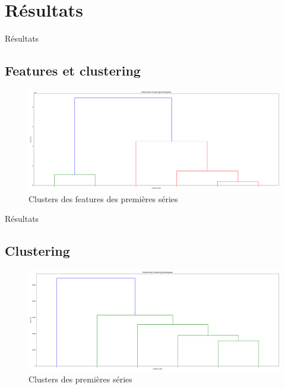 \documentclass{beamer}
\begin{document}
\section{Résultats}\label{sec:résultats}
\begin{frame}{Résultats}
    \subsection{Features et clustering}\label{subsec:features-et-clustering}
    \begin{figure}[H]
        \centering
        \includegraphics[width=\textwidth]{features_clusters.png}
        \caption{Clusters des features des premières séries}
        \label{fig:features_clusters}
    \end{figure}
\end{frame}

\begin{frame}{Résultats}
    \subsection{Clustering}\label{subsec:clustering}
    \begin{figure}[H]
        \centering
        \includegraphics[width=\textwidth]{direct_clusters.png}
        \caption{Clusters des premières séries}
        \label{fig:direct_clusters}
    \end{figure}
\end{frame}

\begin{frame}
\end{frame}
\end{document}
